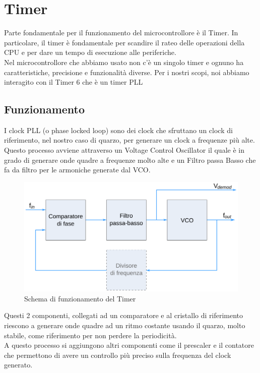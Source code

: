 \pagebreak
\section{Timer}
Parte fondamentale per il funzionamento del microcontrollore è il Timer. In particolare, il timer è fondamentale per scandire il rateo delle operazioni della CPU e per dare un tempo di esecuzione alle periferiche.\\

Nel microcontrollore che abbiamo usato non c'è un singolo timer e ognuno ha caratteristiche, precisione e funzionalità diverse. 
Per i nostri scopi, noi abbiamo interagito con il Timer 6 che è un timer PLL

\subsection{Funzionamento}
I clock PLL (o phase locked loop) sono dei clock che sfruttano un clock di riferimento, nel nostro caso di quarzo, per generare un clock a frequenze più alte. Questo processo avviene attraverso un Voltage Control Oscillator il quale è in grado di generare onde quadre a frequenze molto alte e un Filtro passa Basso che fa da filtro per le armoniche generate dal VCO.\\

\begin{figure}[h]
    \centering
    \includegraphics[width=0.7\linewidth]{microcontrollore/assets/PLL1_it.png}
    \caption{Schema di funzionamento del Timer}
    \label{fig:Timer}
\end{figure}

Questi 2 componenti, collegati ad un comparatore e al cristallo di riferimento riescono a generare onde quadre ad un ritmo costante usando il quarzo, molto stabile, come riferimento per non perdere la periodicità.\\
A questo processo si aggiungono altri componenti come il prescaler e il contatore che permettono di avere un controllo più preciso sulla frequenza del clock generato.\\

